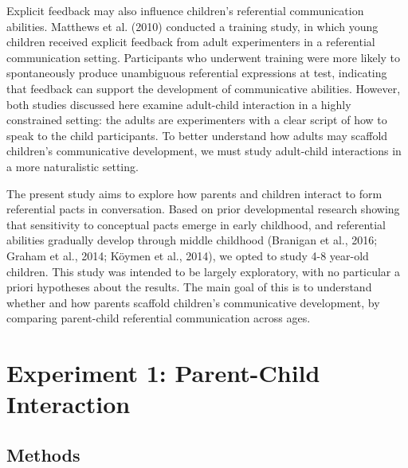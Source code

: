 \documentclass[10pt, letterpaper]{article}
\begin{document}
Explicit feedback may also influence children's referential
communication abilities. Matthews et al. (2010) conducted a training
study, in which young children received explicit feedback from adult
experimenters in a referential communication setting. Participants who
underwent training were more likely to spontaneously produce unambiguous
referential expressions at test, indicating that feedback can support
the development of communicative abilities. However, both studies
discussed here examine adult-child interaction in a highly constrained
setting: the adults are experimenters with a clear script of how to
speak to the child participants. To better understand how adults may
scaffold children's communicative development, we must study adult-child
interactions in a more naturalistic setting.

The present study aims to explore how parents and children interact to
form referential pacts in conversation. Based on prior developmental
research showing that sensitivity to conceptual pacts emerge in early
childhood, and referential abilities gradually develop through middle
childhood (Branigan et al., 2016; Graham et al., 2014; Köymen et al.,
2014), we opted to study 4-8 year-old children. This study was intended
to be largely exploratory, with no particular a priori hypotheses about
the results. The main goal of this is to understand whether and how
parents scaffold children's communicative development, by comparing
parent-child referential communication across ages.

\hypertarget{experiment-1-parent-child-interaction}{%
\section{Experiment 1: Parent-Child
Interaction}\label{experiment-1-parent-child-interaction}}

\hypertarget{methods}{%
\subsection{Methods}\label{methods}}
\end{document}
